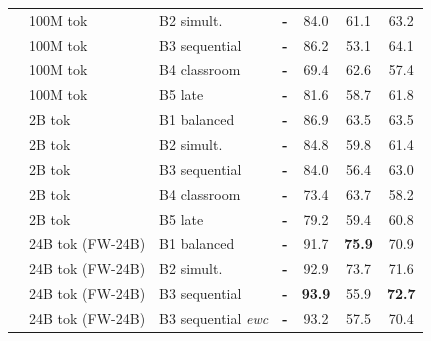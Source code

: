 \documentclass[11pt]{article}
\begin{document}
\begin{table}[ht!]
\begin{minipage}[t]{0.49\linewidth}
\begin{tabular}{ll l cc cc}
 & 100M tok & B2 simult. & \textbf{-} & \cellcolor[rgb]{0.815,1.000,0.815} 84.0 & \cellcolor[rgb]{0.921,1.000,0.921} 61.1 & \cellcolor[rgb]{0.891,1.000,0.891} 63.2 \\
 & 100M tok & B3 sequential & \textbf{-} & \cellcolor[rgb]{0.803,1.000,0.803} 86.2 & \cellcolor[rgb]{0.978,1.000,0.978} 53.1 & \cellcolor[rgb]{0.884,1.000,0.884} 64.1 \\
 & 100M tok & B4 classroom & \textbf{-} & \cellcolor[rgb]{0.894,1.000,0.894} 69.4 & \cellcolor[rgb]{0.910,1.000,0.910} 62.6 & \cellcolor[rgb]{0.939,1.000,0.939} 57.4 \\
 & 100M tok & B5 late & \textbf{-} & \cellcolor[rgb]{0.828,1.000,0.828} 81.6 & \cellcolor[rgb]{0.938,1.000,0.938} 58.7 & \cellcolor[rgb]{0.903,1.000,0.903} 61.8 \\
\addlinespace[1.5pt]
 & 2B tok & B1 balanced & \textbf{-} & \cellcolor[rgb]{0.799,1.000,0.799} 86.9 & \cellcolor[rgb]{0.904,1.000,0.904} 63.5 & \cellcolor[rgb]{0.889,1.000,0.889} 63.5 \\
 & 2B tok & B2 simult. & \textbf{-} & \cellcolor[rgb]{0.810,1.000,0.810} 84.8 & \cellcolor[rgb]{0.930,1.000,0.930} 59.8 & \cellcolor[rgb]{0.906,1.000,0.906} 61.4 \\
 & 2B tok & B3 sequential & \textbf{-} & \cellcolor[rgb]{0.815,1.000,0.815} 84.0 & \cellcolor[rgb]{0.955,1.000,0.955} 56.4 & \cellcolor[rgb]{0.893,1.000,0.893} 63.0 \\
 & 2B tok & B4 classroom & \textbf{-} & \cellcolor[rgb]{0.872,1.000,0.872} 73.4 & \cellcolor[rgb]{0.903,1.000,0.903} 63.7 & \cellcolor[rgb]{0.932,1.000,0.932} 58.2 \\
 & 2B tok & B5 late & \textbf{-} & \cellcolor[rgb]{0.841,1.000,0.841} 79.2 & \cellcolor[rgb]{0.933,1.000,0.933} 59.4 & \cellcolor[rgb]{0.911,1.000,0.911} 60.8 \\
 \addlinespace[1.5pt]
 & 24B tok (FW-24B) & B1 balanced & \textbf{-} & \cellcolor[rgb]{0.773,1.000,0.773} 91.7 & \cellcolor[rgb]{0.826,1.000,0.826} \textbf{75.9} & \cellcolor[rgb]{0.840,1.000,0.840} 70.9 \\
 & 24B tok (FW-24B) & B2 simult. & \textbf{-} & \cellcolor[rgb]{0.767,1.000,0.767} 92.9 & \cellcolor[rgb]{0.838,1.000,0.838} 73.7 & \cellcolor[rgb]{0.836,1.000,0.836} 71.6 \\
 & 24B tok (FW-24B) & B3 sequential & \textbf{-} & \cellcolor[rgb]{0.762,1.000,0.762} \textbf{93.9} & \cellcolor[rgb]{1.000,0.965,0.965} 55.9 & \cellcolor[rgb]{0.831,1.000,0.831} \textbf{72.7} \\
 & 24B tok (FW-24B) & B3 sequential {\scriptsize\textit{ewc}} & \textbf{-} & \cellcolor[rgb]{0.765,1.000,0.765} 93.2 & \cellcolor[rgb]{0.988,1.000,0.988} 57.5 & \cellcolor[rgb]{0.843,1.000,0.843} 70.4 \\

\end{tabular}
\end{minipage}
\end{table}
\end{document}
